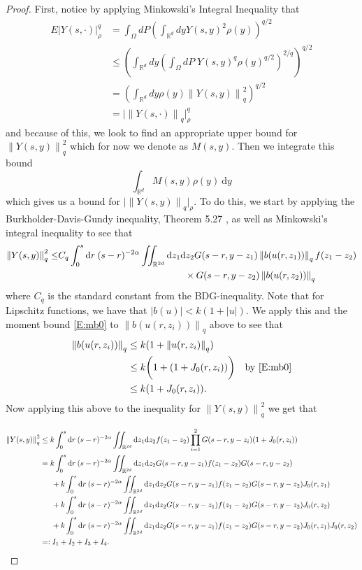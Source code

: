 \documentclass[a4paper,11pt]{article}%
\numberwithin{equation}{section}
\theoremstyle{plain}
\theoremstyle{definition}
\newcommand{\R}{\mathbb{R}}
\newcommand{\Norm}[1]{\left\|  #1   \right\|}
\newcommand{\ud}{\ensuremath{ \mathrm{d} }}
\begin{document}
\begin{proof} First, notice by applying Minkowski's Integral Inequality that
	\begin{align*}
	E |Y(s,\cdot)|_{\rho}^q &= \int_\Omega dP \left(\int_{\R^d} dy Y(s,y)^2\rho(y) \right)^{q/2}
	\\ &\le \left(\int_{\R^d}dy \left( \int_\Omega dP \; Y(s,y)^q \rho(y)^{q/2} \right)^{2/q}\right)^{q/2}
	\\ &= \left(\int_{\R^d}dy \rho(y) \Norm{ Y(s,y) }_q^2 \right)^{q/2}
	\\ &= \big| \Norm{ Y(s,\cdot) }_q \big|_\rho^q
	\end{align*}
	and because of this, we look to find an appropriate upper bound for $\Norm{Y(s,y)}^2_q$ which for now we denote as
	$M(s,y)$. Then we integrate this bound $$ \int_{\R^d}M(s,y)\rho(y)\:\ud y$$ which gives us a bound for $\big|
	\Norm{Y(s,y)}_q\big|_\rho$. To do this, we start by applying the Burkholder-Davis-Gundy inequality, Theorem 5.27
	\cite{DalangEtc09Minicourse}, as well as Minkowski's integral inequality to see that
	\begin{align*}
	\Norm{Y(s,y)}_q^2 \le & C_q \int_0^s \ud r \: (s-r)^{-2\alpha} \iint_{\R^{2d}} \ud z_1\ud z_2 G(s-r,y-z_1)
	\Norm{b(u(r,z_1))}_q f(z_1-z_2)\\
	&\hspace{13.5em} \times  G(s-r,y-z_2) \Norm{b(u(r,z_2))}_q
	\end{align*}
	where $C_q$ is the standard constant from the BDG-inequality. Note that for Lipschitz functions, we have that
	$|b(u)|<k(1+|u|)$. We apply this and the moment bound \eqref{E:mb0} to $\Norm{b(u(r,z_i))}_q$ above to see that
	\begin{align*}
	\Norm{b(u(r,z_i))}_q
	& \le k(1+\Norm{u(r,z_i)}_q)
	\\ & \le k\bigg(1+(1+J_0(r,z_i))\bigg) \quad \text{by \eqref{E:mb0}}
	\\ & \le k(1+J_0(r,z_i)).
	\end{align*}
	Now applying this above  to the inequality for $\Norm{Y(s,y)}_q^2$ we get that

	\begin{align*}
	\Norm{Y(s,y)}_q^2 &\le k \int_0^s \ud r \: (s-r)^{-2\alpha} \iint_{\R^{2d}} \ud z_1\ud z_2 f(z_1-z_2) \prod_{i=1}^2  G(s-r,y-z_i)  (1+J_0(r,z_i))
	\\ &=  k \int_0^s \ud r \: (s-r)^{-2\alpha} \iint_{\R^{2d}} \ud z_1\ud z_2 G(s-r,y-z_1)f(z_1-z_2)G(s-r,y-z_2)
	\\ &\hspace{1.5em}+  k \int_0^s \ud r \: (s-r)^{-2\alpha} \iint_{\R^{2d}} \ud z_1\ud z_2 G(s-r,y-z_1)f(z_1-z_2)G(s-r,y-z_2)J_0(r,z_1)
	\\ &\hspace{1.5em}+  k \int_0^s \ud r \: (s-r)^{-2\alpha} \iint_{\R^{2d}} \ud z_1\ud z_2 G(s-r,y-z_1)f(z_1-z_2)G(s-r,y-z_2)J_0(r,z_2)
	\\ &\hspace{1.5em}+  k \int_0^s \ud r \: (s-r)^{-2\alpha} \iint_{\R^{2d}} \ud z_1\ud z_2 G(s-r,y-z_1)f(z_1-z_2)G(s-r,y-z_2)J_0(r,z_1)J_0(r,z_2)\\
	&=: I_1 +I_2+I_3+I_4.
	\end{align*}


\end{proof}
\end{document}
